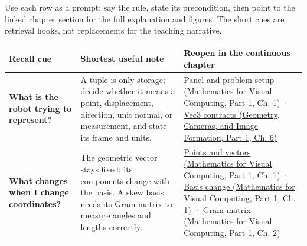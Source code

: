 \hypertarget{appendix-38d9c8aca357-one-page-active-recall-mini-atlas}{}

Use each row as a prompt: say the rule, state its precondition, then point to the linked chapter section for the full explanation and figures. The short cues are retrieval hooks, not replacements for the teaching narrative.

{\def\LTcaptype{none} %
\begin{longtable}[]{@{}
  >{\raggedright\arraybackslash}p{}
  >{\raggedright\arraybackslash}p{}
  >{\raggedright\arraybackslash}p{}@{}}
\toprule\noalign{}
\begin{minipage}[b]{\linewidth}\raggedright
Recall cue
\end{minipage} & \begin{minipage}[b]{\linewidth}\raggedright
Shortest useful note
\end{minipage} & \begin{minipage}[b]{\linewidth}\raggedright
Reopen in the continuous chapter
\end{minipage} \\
\midrule\noalign{}
\endhead
\bottomrule\noalign{}
\endlastfoot
\textbf{What is the robot trying to represent?} & A tuple is only storage; decide whether it means a point, displacement, direction, unit normal, or measurement, and state its frame and units. & \href{../02-Mathematics-for-Visual-Computing-P01/main.pdf\#nameddest=01-foundations-i-ch017-the-panel-gives-us-a-reason-to-learn}{Panel and problem setup (Mathematics for Visual Computing, Part 1, Ch. 1)} · \href{../03-Geometry-Cameras-and-Image-Formation-P01/main.pdf\#nameddest=02-foundations-ii-ch037-three-stored-numbers-are-not-the-complete-contract}{Vec3 contracts (Geometry, Cameras, and Image Formation, Part 1, Ch. 6)} \\
\textbf{What changes when I change coordinates?} & The geometric vector stays fixed; its components change with the basis. A skew basis needs its Gram matrix to measure angles and lengths correctly. & \href{../02-Mathematics-for-Visual-Computing-P01/main.pdf\#nameddest=01-foundations-i-ch017-an-arrow-is-not-the-address-written-beside-it}{Points and vectors (Mathematics for Visual Computing, Part 1, Ch. 1)} · \href{../02-Mathematics-for-Visual-Computing-P01/main.pdf\#nameddest=01-foundations-i-ch017-a-basis-is-a-measuring-arrangement-not-the-vector-itself}{Basis change (Mathematics for Visual Computing, Part 1, Ch. 1)} · \href{../02-Mathematics-for-Visual-Computing-P01/main.pdf\#nameddest=01-foundations-i-ch018-a-gram-matrix-remembers-the-geometry-of-a-slanted-basis}{Gram matrix (Mathematics for Visual Computing, Part 1, Ch. 2)} \\

\end{longtable}}
